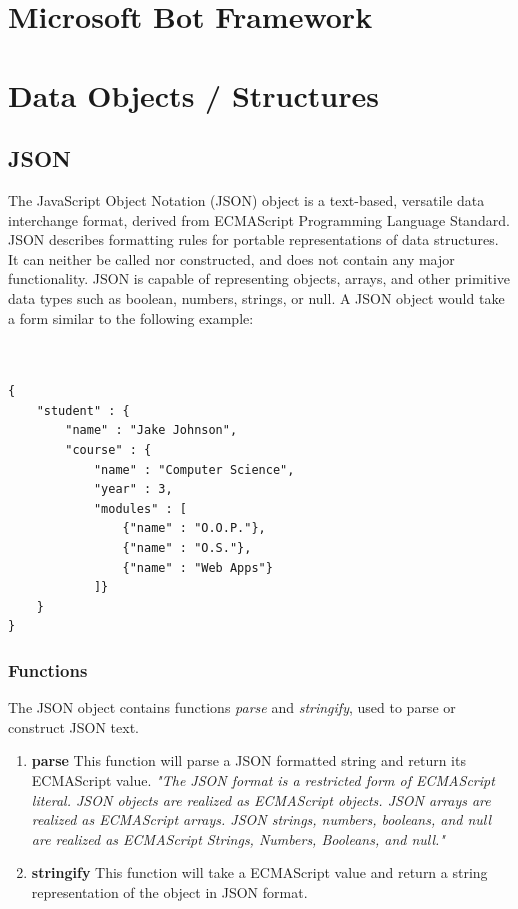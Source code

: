 \section{Microsoft Bot Framework}

\section{Data Objects / Structures}
\subsection{JSON}
	The JavaScript Object Notation (JSON) object is a text-based, versatile data interchange format, derived from ECMAScript Programming Language Standard. JSON describes formatting rules for portable representations of data structures\cite{crockford}. It can neither be called nor constructed, and does not contain any major functionality\cite{ecma}. JSON is capable of representing objects, arrays, and other primitive data types such as boolean, numbers, strings, or null\cite{crockford}.  A JSON object would take a form similar to the following example:
\\
\\
\\
\begin{verbatim}
{
	"student" : {
		"name" : "Jake Johnson",
		"course" : {
			"name" : "Computer Science",
			"year" : 3,
			"modules" : [ 
				{"name" : "O.O.P."},
				{"name" : "O.S."},
				{"name" : "Web Apps"} 
			]}
	}
}
\end{verbatim}
\subsubsection{Functions}
The JSON object contains functions \emph{parse} and \emph{stringify}, used to parse or construct JSON text. 
\begin{enumerate}
\item \textbf{parse} This function will parse a JSON formatted string and return its ECMAScript value. \emph{"The JSON format is a restricted form of ECMAScript literal. JSON objects are realized as ECMAScript objects. JSON arrays are realized as ECMAScript arrays. JSON strings, numbers, booleans, and null are realized as ECMAScript Strings, Numbers, Booleans, and null."\cite{crockford}}
\item \textbf{stringify} This function will take a ECMAScript value and return a string representation of the object in JSON format. \cite{crockford}
\end{enumerate}
